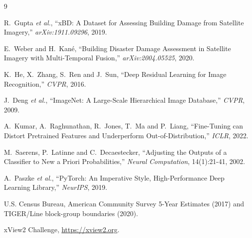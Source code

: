 \documentclass[10pt,twocolumn]{article}
\begin{document}
\begin{thebibliography}{9}
\small

R.~Gupta \emph{et al.},
``xBD: A Dataset for Assessing Building Damage from Satellite Imagery,''
\emph{arXiv:1911.09296}, 2019.

E.~Weber and H.~Kan\'e,
``Building Disaster Damage Assessment in Satellite Imagery with Multi-Temporal Fusion,''
\emph{arXiv:2004.05525}, 2020.

K.~He, X.~Zhang, S.~Ren and J.~Sun,
``Deep Residual Learning for Image Recognition,'' \emph{CVPR}, 2016.

J.~Deng \emph{et al.},
``ImageNet: A Large-Scale Hierarchical Image Database,'' \emph{CVPR}, 2009.

A.~Kumar, A.~Raghunathan, R.~Jones, T.~Ma and P.~Liang,
``Fine-Tuning can Distort Pretrained Features and Underperform Out-of-Distribution,''
\emph{ICLR}, 2022.

M.~Saerens, P.~Latinne and C.~Decaestecker,
``Adjusting the Outputs of a Classifier to New a Priori Probabilities,''
\emph{Neural Computation}, 14(1):21-41, 2002.

A.~Paszke \emph{et al.},
``PyTorch: An Imperative Style, High-Performance Deep Learning Library,'' \emph{NeurIPS}, 2019.

U.S. Census Bureau, American Community Survey 5-Year Estimates (2017) and TIGER/Line block-group
boundaries (2020).

xView2 Challenge, \url{https://xview2.org}.

\end{thebibliography}
\end{document}
